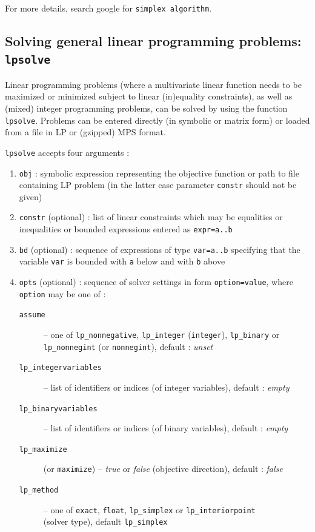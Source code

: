 \documentclass[a4paper,11pt]{book}
\begin{document}
For more details, search google for \verb|simplex algorithm|.

\subsection{Solving general linear programming problems: {\tt lpsolve}}
Linear programming problems (where a multivariate linear function needs to be maximized or minimized subject to linear (in)equality constraints), as well as (mixed) integer programming problems, can be solved by using the function {\tt lpsolve}. Problems can be entered directly (in symbolic or matrix form) or loaded from a file in LP or (gzipped) MPS format.

{\tt lpsolve} accepts four arguments :
\begin{enumerate}
\item {\tt obj} : symbolic expression representing the objective function or path to file containing LP problem (in the latter case parameter {\tt constr} should not be given)
\item {\tt constr} (optional) : list of linear constraints which may be equalities or inequalities or bounded expressions entered as {\tt expr=a..b}
\item {\tt bd} (optional) : sequence of expressions of type {\tt var=a..b} specifying that the variable {\tt var} is bounded with {\tt a} below and with {\tt b} above
\item {\tt opts} (optional) : sequence of solver settings in form {\tt option=value}, where {\tt option} may be one of :
\begin{description}
	\item [\tt assume] -- one of {\tt lp\_nonnegative}, {\tt lp\_integer} ({\tt integer}), {\tt lp\_binary} or {\tt lp\_nonnegint} (or {\tt nonnegint}), default : \emph{unset}
	\item [\tt lp\_integervariables] -- list of identifiers or indices (of integer variables), default : \emph{empty}
	\item [\tt lp\_binaryvariables] -- list of identifiers or indices (of binary variables), default : \emph{empty}
	\item [\tt lp\_maximize] (or {\tt maximize}) -- \emph{true} or \emph{false} (objective direction), default : \emph{false}
	\item [\tt lp\_method] -- one of {\tt exact}, {\tt float}, {\tt lp\_simplex} or {\tt lp\_interiorpoint}\\(solver type), default {\tt lp\_simplex}

\end{description}
\end{enumerate}
\end{document}
